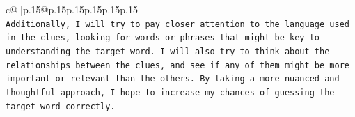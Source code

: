 \documentclass{article}
\begin{document}
{\begin{supertabular}{c@{$\;$}|p{.15\linewidth}@{}p{.15\linewidth}p{.15\linewidth}p{.15\linewidth}p{.15\linewidth}p{.15\linewidth}}
{{{\\ 
\texttt{Additionally, I will try to pay closer attention to the language used in the clues, looking for words or phrases that might be key to understanding the target word. I will also try to think about the relationships between the clues, and see if any of them might be more important or relevant than the others. By taking a more nuanced and thoughtful approach, I hope to increase my chances of guessing the target word correctly.} \\
            }
        }
    }
     \\ \\

\end{supertabular}
}
\end{document}
